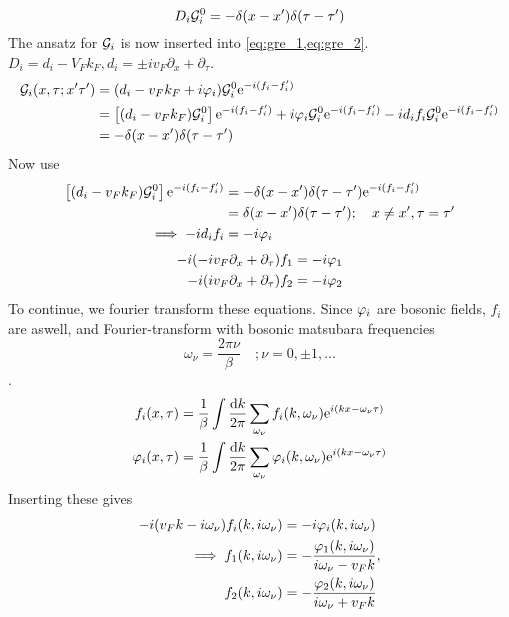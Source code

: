 \[D_i\mathcal{G}_i^0 = -\delta(x-x')\delta(\tau-\tau')\]
The ansatz for $\mathcal{G}_i$ is now inserted into \cref{eq:gre_1,eq:gre_2}.
$D_i = d_i - V_Fk_F, d_i = \pm iv_F\partial_x + \partial_\tau$.
\begin{align*}
\mathcal{G}_i(x,\tau;x'\tau') &=(d_i - v_Fk_F+i\varphi_i)\mathcal{G}_i^0\mathrm{e}^{-i(f_i-f_i')}\\ &=\left[(d_i-v_Fk_F)\mathcal{G}_i^0\right]\mathrm{e}^{-i(f_i-f_i')} + i\varphi_i\mathcal{G}_i^0\mathrm{e}^{-i(f_i-f_i')} -id_if_i\mathcal{G}_i^0\mathrm{e}^{-i(f_i-f_i')} \\
&= -\delta(x-x')\delta(\tau-\tau')
\end{align*}
Now use
\begin{align*}
\left[(d_i-v_Fk_F)\mathcal{G}_i^0\right]\mathrm{e}^{-i(f_i-f_i')} &= -\delta(x-x')\delta(\tau-\tau')\mathrm{e}^{-i(f_i-f_i')}\\&=\delta(x-x')\delta(\tau-\tau');\quad x\ne x',\tau=\tau' \\
\implies  -id_if_i &= -i\varphi_i
\end{align*}
\begin{align}
-i(-iv_F\partial_x+\partial_\tau)f_1 &= -i\varphi_1 \\
-i(iv_F\partial_x+\partial_\tau)f_2 &= -i\varphi_2
\end{align}
To continue, we fourier transform these equations. Since $\varphi_i$ are bosonic fields, $f_i$ are aswell, and Fourier-transform with bosonic matsubara frequencies \[\omega_\nu = \frac{2\pi\nu}{\beta}\quad;\nu = 0,\pm1,\dots\].
\begin{align}
f_i(x,\tau) &= \frac{1}{\beta}\int\frac{\dd k}{2\pi}\sum_{\omega_\nu}f_i(k,\omega_\nu)\mathrm{e}^{i(kx-\omega_\nu\tau)}\\
\label{eq:fourier_transformed_1d_fields}
\varphi_i(x,\tau) &= \frac{1}{\beta}\int\frac{\dd k}{2\pi}\sum_{\omega_\nu}\varphi_i(k,\omega_\nu)\mathrm{e}^{i(kx-\omega_\nu\tau)}
\end{align}
Inserting these gives
\begin{align}
\nonumber
-i(v_Fk-i\omega_\nu)f_i(k,i\omega_\nu) &= -i\varphi_i(k,i\omega_\nu) \\
\implies f_1(k,i\omega_\nu) 
&= -\frac{\varphi_1(k,i\omega_\nu)}{i\omega_\nu - v_Fk}, \\
f_2(k,i\omega_\nu) &= -\frac{\varphi_2(k,i\omega_\nu)}{i\omega_\nu + v_Fk}
\end{align}

